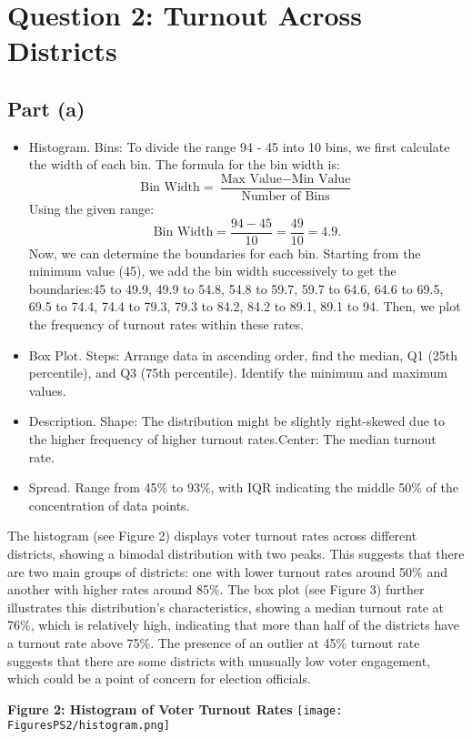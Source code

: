\documentclass{article}
\begin{document}
\section*{Question 2: Turnout Across Districts}

\subsection*{Part (a)}
\begin{itemize}
    \item Histogram. Bins: To divide the range 94 - 45 into 10 bins, we first calculate the width of each bin. The formula for the bin width is:\[ \text{Bin Width} = \frac{\text{Max Value} - \text{Min Value}}{\text{Number of Bins}} \]Using the given range:\[ \text{Bin Width} = \frac{94 - 45}{10} = \frac{49}{10} = 4.9.\] Now, we can determine the boundaries for each bin. Starting from the minimum value (45), we add the bin width successively to get the boundaries:45 to 49.9, 49.9 to 54.8, 54.8 to 59.7, 59.7 to 64.6, 64.6 to 69.5, 69.5 to 74.4, 74.4 to 79.3, 79.3 to 84.2, 84.2 to 89.1, 89.1 to 94. Then, we plot the frequency of turnout rates within these rates.
    \item Box Plot. Steps: Arrange data in ascending order, find the median, Q1 (25th percentile), and Q3 (75th percentile). Identify the minimum and maximum values.
    \item Description. Shape: The distribution might be slightly right-skewed due to the higher frequency of higher turnout rates.Center: The median turnout rate.
    \item Spread. Range from 45\% to 93\%, with IQR indicating the middle 50\% of the concentration of data points.
\end{itemize}


The histogram (see Figure 2) displays voter turnout rates across different districts, showing a bimodal distribution with two peaks. This suggests that there are two main groups of districts: one with lower turnout rates around 50\% and another with higher rates around 85\%. The box plot (see Figure 3) further illustrates this distribution's characteristics, showing a median turnout rate at 76\%, which is relatively high, indicating that more than half of the districts have a turnout rate above 75\%. The presence of an outlier at 45\% turnout rate suggests that there are some districts with unusually low voter engagement, which could be a point of concern for election officials.

\begin{center}
\textbf{Figure 2: Histogram of Voter Turnout Rates}
\texttt{[image: FiguresPS2/histogram.png]}
\end{center}
\end{document}
